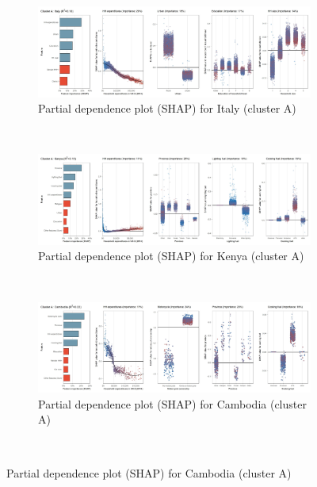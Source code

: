 \begin{figure}[ht!]\ContinuedFloat
    \centering
   \begin{subfigure}[b]{\textwidth}
         \centering
         \caption{Partial dependence plot (SHAP) for Italy (cluster A)}
         \label{fig:5b_ITA}
         \includegraphics[width=\textwidth]{Figure 5b/Figure_5b_ITA}     
    \end{subfigure}
    \\
    \vspace{0.5cm}
    \begin{subfigure}[b]{\textwidth}
         \centering
         \caption{Partial dependence plot (SHAP) for Kenya (cluster A)}
         \label{fig:5b_KEN}
         \includegraphics[width=\textwidth]{Figure 5b/Figure_5b_KEN}     
         \end{subfigure}
    \\
    \vspace{0.5cm}
   \begin{subfigure}[b]{\textwidth}        
         \centering
         \caption{Partial dependence plot (SHAP) for Cambodia (cluster A)}
         \label{fig:5b_KHM}
         \includegraphics[width=\textwidth]{Figure 5b/Figure_5b_KHM}
         \end{subfigure}
    \\
    \vspace{0.5cm}
   

\end{figure}
